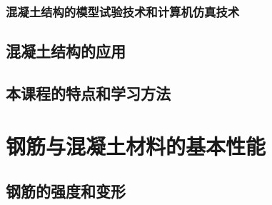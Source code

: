 \documentclass{article}
\begin{document}
\subsubsection{混凝土结构的模型试验技术和计算机仿真技术}
\subsection{混凝土结构的应用}
\subsection{本课程的特点和学习方法}
\section{钢筋与混凝土材料的基本性能}
\subsection{钢筋的强度和变形}
\end{document}
